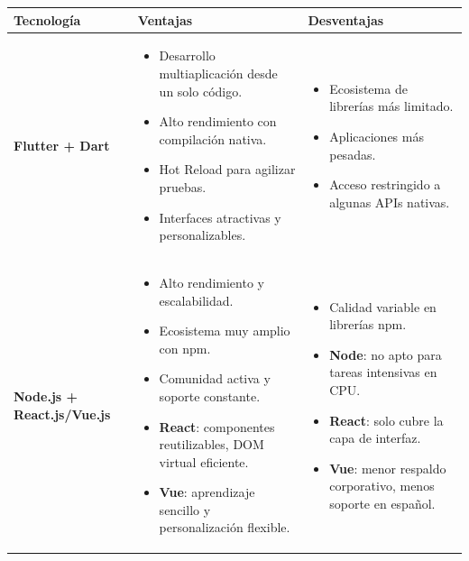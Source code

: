 \begin{table}[H]
\centering
\begin{tabularx}{\textwidth}{|p{3.5cm}|X|X|}
\hline
\textbf{Tecnología} & \textbf{Ventajas} & \textbf{Desventajas} \\
\hline
\parbox[t]{\hsize}{\textbf{Flutter + Dart} \\[0.5em] \vspace*{\fill} \parencite{flutter}} &
\begin{itemize}[leftmargin=*]
    \item Desarrollo multiaplicación desde un solo código.
    \item Alto rendimiento con compilación nativa.
    \item Hot Reload para agilizar pruebas.
    \item Interfaces atractivas y personalizables.
\end{itemize} &
\begin{itemize}[leftmargin=*]
    \item Ecosistema de librerías más limitado.
    \item Aplicaciones más pesadas.
    \item Acceso restringido a algunas APIs nativas.
\end{itemize} \\
\hline
\parbox[t]{\hsize}{\textbf{Node.js + React.js/Vue.js} \\[0.5em] \vspace*{\fill} \parencite{nodejs,react,vuejs}} &
\begin{itemize}[leftmargin=*]
    \item Alto rendimiento y escalabilidad.
    \item Ecosistema muy amplio con npm.
    \item Comunidad activa y soporte constante.
    \item \textbf{React}: componentes reutilizables, DOM virtual eficiente.
    \item \textbf{Vue}: aprendizaje sencillo y personalización flexible.
\end{itemize} &
\begin{itemize}[leftmargin=*]
    \item Calidad variable en librerías npm.
    \item \textbf{Node}: no apto para tareas intensivas en CPU.
    \item \textbf{React}: solo cubre la capa de interfaz.
    \item \textbf{Vue}: menor respaldo corporativo, menos soporte en español.

\end{itemize}
\end{tabularx}
\end{table}
